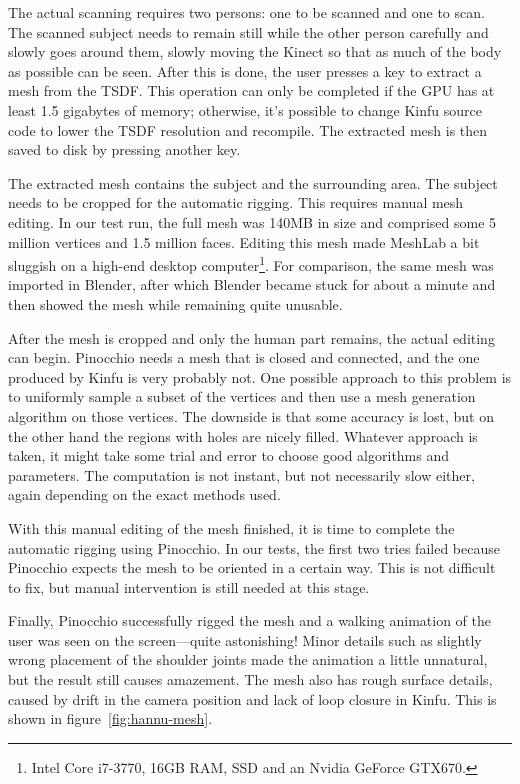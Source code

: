 The actual scanning requires two persons: one to be scanned and one to scan. The scanned subject needs to remain still while the other person carefully and slowly goes around them, slowly moving the Kinect so that as much of the body as possible can be seen. After this is done, the user presses a key to extract a mesh from the TSDF. This operation can only be completed if the GPU has at least 1.5 gigabytes of memory; otherwise, it's possible to change Kinfu source code to lower the TSDF resolution and recompile. The extracted mesh is then saved to disk by pressing another key.

The extracted mesh contains the subject and the surrounding area. The subject needs to be cropped for the automatic rigging. This requires manual mesh editing. In our test run, the full mesh was 140MB in size and comprised some 5 million vertices and 1.5 million faces. Editing this mesh made MeshLab a bit sluggish on a high-end desktop computer\footnote{Intel Core i7-3770, 16GB RAM, SSD and an Nvidia GeForce GTX670.}. For comparison, the same mesh was imported in Blender, after which Blender became stuck for about a minute and then showed the mesh while remaining quite unusable.

After the mesh is cropped and only the human part remains, the actual editing can begin. Pinocchio needs a mesh that is closed and connected, and the one produced by Kinfu is very probably not. One possible approach to this problem is to uniformly sample a subset of the vertices and then use a mesh generation algorithm on those vertices. The downside is that some accuracy is lost, but on the other hand the regions with holes are nicely filled. Whatever approach is taken, it might take some trial and error to choose good algorithms and parameters. The computation is not instant, but not necessarily slow either, again depending on the exact methods used.

With this manual editing of the mesh finished, it is time to complete the automatic rigging using Pinocchio. In our tests, the first two tries failed because Pinocchio expects the mesh to be oriented in a certain way. This is not difficult to fix, but manual intervention is still needed at this stage.

Finally, Pinocchio successfully rigged the mesh and a walking animation of the user was seen on the screen---quite astonishing! Minor details such as slightly wrong placement of the shoulder joints made the animation a little unnatural, but the result still causes amazement. The mesh also has rough surface details, caused by drift in the camera position and lack of loop closure in Kinfu. This is shown in figure~\ref{fig:hannu-mesh}.

